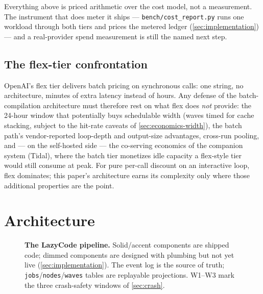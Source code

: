 \documentclass[11pt]{article}
\begin{document}
Everything above is priced arithmetic over the cost model, not a measurement. The instrument that does meter it ships --- \texttt{bench/cost\_report.py} runs one workload through both tiers and prices the metered ledger (\cref{sec:implementation}) --- and a real-provider spend measurement is still the named next step.

\subsection{The flex-tier confrontation}
\label{sec:flex}

OpenAI's flex tier delivers batch pricing on synchronous calls: one string, no architecture, minutes of extra latency instead of hours. Any defense of the batch-compilation architecture must therefore rest on what flex does \emph{not} provide: the 24-hour window that potentially buys schedulable width (waves timed for cache stacking, subject to the hit-rate caveats of \cref{sec:economics-width}), the batch path's vendor-reported loop-depth and output-size advantages, cross-run pooling, and --- on the self-hosted side --- the co-serving economics of the companion system (Tidal), where the batch tier monetizes idle capacity a flex-style tier would still consume at peak. For pure per-call discount on an interactive loop, flex dominates; this paper's architecture earns its complexity only where those additional properties are the point.

\section{Architecture}
\label{sec:architecture}

\begin{figure}[!htbp]
\centering

\caption{\textbf{The LazyCode pipeline.} Solid/accent components are shipped code; dimmed components are designed with plumbing but not yet live (\cref{sec:implementation}). The event log is the source of truth; \texttt{jobs}/\texttt{nodes}/\texttt{waves} tables are replayable projections. W1--W3 mark the three crash-safety windows of \cref{sec:crash}.}
\label{fig:pipeline}
\end{figure}
\end{document}
